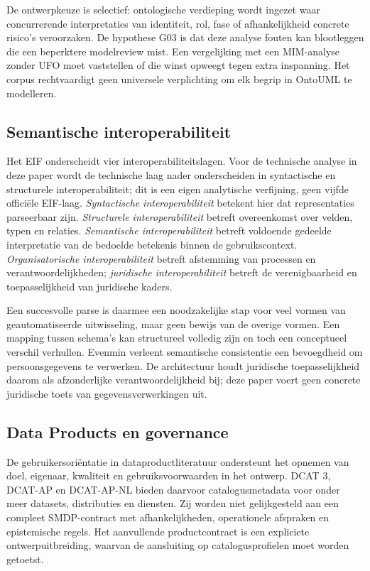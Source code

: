 De ontwerpkeuze is selectief: ontologische verdieping wordt ingezet waar concurrerende interpretaties van identiteit, rol, fase of afhankelijkheid concrete risico’s veroorzaken. De hypothese G03 is dat deze analyse fouten kan blootleggen die een beperktere modelreview mist. Een vergelijking met een MIM-analyse zonder UFO moet vaststellen of die winst opweegt tegen extra inspanning. Het corpus rechtvaardigt geen universele verplichting om elk begrip in OntoUML te modelleren.

\subsection{Semantische interoperabiliteit}
Het EIF onderscheidt vier interoperabiliteitslagen. Voor de technische analyse in deze paper wordt de technische laag nader onderscheiden in syntactische en structurele interoperabiliteit; dit is een eigen analytische verfijning, geen vijfde officiële EIF-laag. \citep{S43} \emph{Syntactische interoperabiliteit} betekent hier dat representaties parseerbaar zijn. \emph{Structurele interoperabiliteit} betreft overeenkomst over velden, typen en relaties. \emph{Semantische interoperabiliteit} betreft voldoende gedeelde interpretatie van de bedoelde betekenis binnen de gebruikscontext. \emph{Organisatorische interoperabiliteit} betreft afstemming van processen en verantwoordelijkheden; \emph{juridische interoperabiliteit} betreft de verenigbaarheid en toepasselijkheid van juridische kaders.

Een succesvolle parse is daarmee een noodzakelijke stap voor veel vormen van geautomatiseerde uitwisseling, maar geen bewijs van de overige vormen. Een mapping tussen schema’s kan structureel volledig zijn en toch een conceptueel verschil verhullen. Evenmin verleent semantische consistentie een bevoegdheid om persoonsgegevens te verwerken. De architectuur houdt juridische toepasselijkheid daarom als afzonderlijke verantwoordelijkheid bij; deze paper voert geen concrete juridische toets van gegevensverwerkingen uit.

\subsection{Data Products en governance}
De gebruikersoriëntatie in dataproductliteratuur ondersteunt het opnemen van doel, eigenaar, kwaliteit en gebruiksvoorwaarden in het ontwerp. \citep{L12} DCAT 3, DCAT-AP en DCAT-AP-NL bieden daarvoor catalogusmetadata voor onder meer datasets, distributies en diensten. Zij worden niet gelijkgesteld aan een compleet SMDP-contract met afhankelijkheden, operationele afspraken en epistemische regels. \citep{S47,S45,S16} Het aanvullende productcontract is een expliciete ontwerpuitbreiding, waarvan de aansluiting op catalogusprofielen moet worden getoetst.

